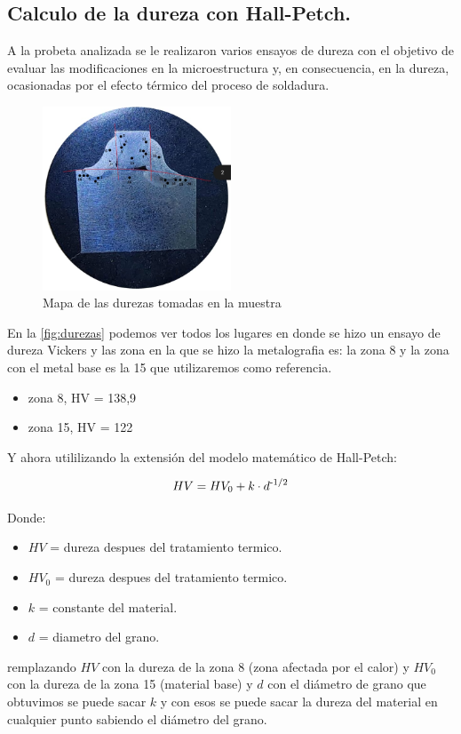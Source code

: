 \documentclass[12pt,a4paper]{article}
\begin{document}
\subsection{Calculo de la dureza con Hall-Petch.}

A la probeta analizada se le realizaron varios ensayos de dureza con el objetivo de evaluar las modificaciones en la microestructura y, en consecuencia, en la dureza, ocasionadas por el efecto térmico del proceso de soldadura.

\begin{figure}[h] 
    \centering
    \includegraphics[width=0.5\textwidth]{Figuras/mapa_de_durezas.png} 
    \caption{Mapa de las durezas tomadas en la muestra}
    \label{fig:durezas}
\end{figure}

En la \autoref{fig:durezas} podemos ver todos los lugares en donde se hizo un ensayo de dureza Vickers y las zona en la que se hizo la metalografia es: la zona 8 y la zona con el metal base es la 15 que utilizaremos como referencia.

\begin{itemize}
    \item zona 8, HV = 138,9
    \item zona 15, HV = 122
\end{itemize}

Y ahora utililizando la extensión del modelo matemático de Hall-Petch:

\begin{equation}
    HV = HV_0 + k\cdot d \textsuperscript{-1/2}
    \label{eq:HV}
\end{equation}

Donde:

\begin{itemize}
    \item $\textit{HV}$ = dureza despues del tratamiento termico.
    \item $\textit{HV}_0$ = dureza despues del tratamiento termico.
    \item $k$ = constante del material.
    \item $d$ = diametro del grano.
\end{itemize}
remplazando $\textit{HV}$ con la dureza de la zona 8 (zona afectada por el calor) y $\textit{HV}_0$ con la dureza de la zona 15 (material base) y $d$ con el diámetro de grano que obtuvimos se puede sacar $k$ y con esos se puede sacar la dureza del material en cualquier punto sabiendo el diámetro del grano.
\end{document}
